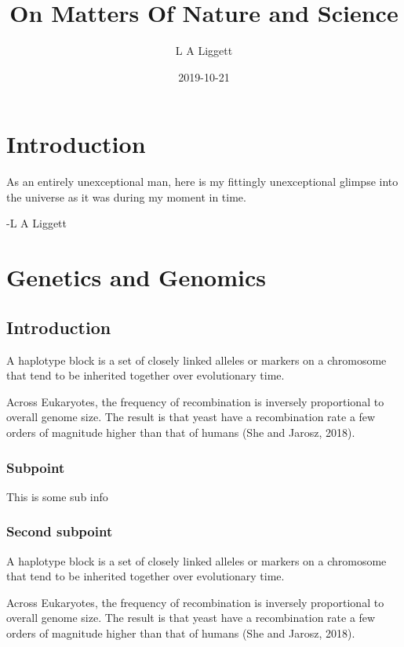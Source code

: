 \documentclass[]{book}
\title{On Matters Of Nature and Science}
\author{L A Liggett}
\date{2019-10-21}
\begin{document}
\maketitle

{
\setcounter{tocdepth}{1}
\tableofcontents
}
\chapter{Introduction}\label{introduction}

As an entirely unexceptional man, here is my fittingly unexceptional
glimpse into the universe as it was during my moment in time.

-L A Liggett

\chapter{Genetics and Genomics}\label{g2}

\section{Introduction}\label{introduction-1}

A haplotype block is a set of closely linked alleles or markers on a
chromosome that tend to be inherited together over evolutionary time.

Across Eukaryotes, the frequency of recombination is inversely
proportional to overall genome size. The result is that yeast have a
recombination rate a few orders of magnitude higher than that of humans
(She and Jarosz, 2018).

\subsection{Subpoint}\label{subpoint}

This is some sub info

\subsection{Second subpoint}\label{second-subpoint}

A haplotype block is a set of closely linked alleles or markers on a
chromosome that tend to be inherited together over evolutionary time.

Across Eukaryotes, the frequency of recombination is inversely
proportional to overall genome size. The result is that yeast have a
recombination rate a few orders of magnitude higher than that of humans
(She and Jarosz, 2018).
\end{document}
